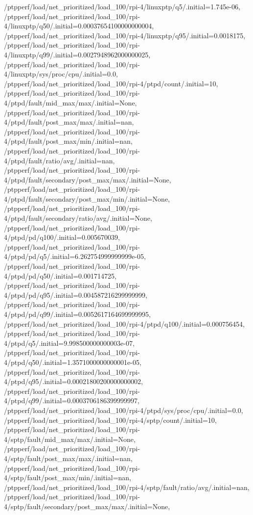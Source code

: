 {    /ptpperf/load/net_prioritized/load_100/rpi-4/linuxptp/q5/.initial=1.745e-06,
    /ptpperf/load/net_prioritized/load_100/rpi-4/linuxptp/q50/.initial=0.00037654100000000004,
    /ptpperf/load/net_prioritized/load_100/rpi-4/linuxptp/q95/.initial=0.0018175,
    /ptpperf/load/net_prioritized/load_100/rpi-4/linuxptp/q99/.initial=0.0027948962000000025,
    /ptpperf/load/net_prioritized/load_100/rpi-4/linuxptp/sys/proc/cpu/.initial=0.0,
    /ptpperf/load/net_prioritized/load_100/rpi-4/ptpd/count/.initial=10,
    /ptpperf/load/net_prioritized/load_100/rpi-4/ptpd/fault/mid_max/max/.initial=None,
    /ptpperf/load/net_prioritized/load_100/rpi-4/ptpd/fault/post_max/max/.initial=nan,
    /ptpperf/load/net_prioritized/load_100/rpi-4/ptpd/fault/post_max/min/.initial=nan,
    /ptpperf/load/net_prioritized/load_100/rpi-4/ptpd/fault/ratio/avg/.initial=nan,
    /ptpperf/load/net_prioritized/load_100/rpi-4/ptpd/fault/secondary/post_max/max/.initial=None,
    /ptpperf/load/net_prioritized/load_100/rpi-4/ptpd/fault/secondary/post_max/min/.initial=None,
    /ptpperf/load/net_prioritized/load_100/rpi-4/ptpd/fault/secondary/ratio/avg/.initial=None,
    /ptpperf/load/net_prioritized/load_100/rpi-4/ptpd/pd/q100/.initial=0.005670039,
    /ptpperf/load/net_prioritized/load_100/rpi-4/ptpd/pd/q5/.initial=6.262754999999999e-05,
    /ptpperf/load/net_prioritized/load_100/rpi-4/ptpd/pd/q50/.initial=0.001714725,
    /ptpperf/load/net_prioritized/load_100/rpi-4/ptpd/pd/q95/.initial=0.004587216299999999,
    /ptpperf/load/net_prioritized/load_100/rpi-4/ptpd/pd/q99/.initial=0.0052617164699999995,
    /ptpperf/load/net_prioritized/load_100/rpi-4/ptpd/q100/.initial=0.000756454,
    /ptpperf/load/net_prioritized/load_100/rpi-4/ptpd/q5/.initial=9.998500000000003e-07,
    /ptpperf/load/net_prioritized/load_100/rpi-4/ptpd/q50/.initial=1.3571000000000001e-05,
    /ptpperf/load/net_prioritized/load_100/rpi-4/ptpd/q95/.initial=0.00021800200000000002,
    /ptpperf/load/net_prioritized/load_100/rpi-4/ptpd/q99/.initial=0.0003706186399999997,
    /ptpperf/load/net_prioritized/load_100/rpi-4/ptpd/sys/proc/cpu/.initial=0.0,
    /ptpperf/load/net_prioritized/load_100/rpi-4/sptp/count/.initial=10,
    /ptpperf/load/net_prioritized/load_100/rpi-4/sptp/fault/mid_max/max/.initial=None,
    /ptpperf/load/net_prioritized/load_100/rpi-4/sptp/fault/post_max/max/.initial=nan,
    /ptpperf/load/net_prioritized/load_100/rpi-4/sptp/fault/post_max/min/.initial=nan,
    /ptpperf/load/net_prioritized/load_100/rpi-4/sptp/fault/ratio/avg/.initial=nan,
    /ptpperf/load/net_prioritized/load_100/rpi-4/sptp/fault/secondary/post_max/max/.initial=None,
}
